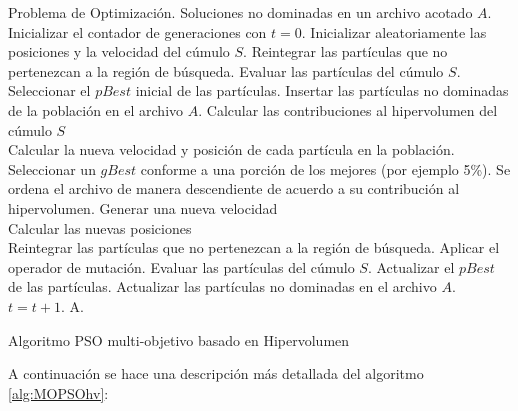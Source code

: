\begin{algorithm}
\begin{algorithmic}[1]
	\REQUIRE Problema de Optimizaci\'on.
	\ENSURE Soluciones no dominadas en un archivo acotado $A$.	  
	  \STATE Inicializar el contador de generaciones con $t=0$.
	  \STATE Inicializar aleatoriamente las posiciones y la velocidad del c\'umulo $S$.
	  \STATE Reintegrar las part\'iculas que no pertenezcan a la regi\'on de b\'usqueda.
	  \STATE Evaluar las part\'iculas del c\'umulo $S$.
	  \STATE Seleccionar el $pBest$ inicial de las part\'iculas.  
	  \STATE Insertar las part\'iculas no dominadas de la poblaci\'on en el archivo $A$.
	  \STATE Calcular las contribuciones al hipervolumen del c\'umulo $S$
	  \\ Calcular la nueva velocidad y posici\'on de cada part\'icula en la poblaci\'on.
	     \STATE Seleccionar un $gBest$ conforme a una porci\'on de los mejores (por ejemplo 5\%). Se ordena el archivo
	     de manera descendiente de acuerdo a su contribuci\'on al hipervolumen.
	     \STATE Generar una nueva velocidad 
		\\  \DIFdelbegin {}\DIFdelend \DIFaddbegin {}\DIFaddend \STATE Calcular las nuevas posiciones 
		\\\DIFdelbegin {}\DIFdelend \DIFaddbegin {}\DIFaddend \ENDFOR
		\STATE Reintegrar las part\'iculas que no pertenezcan a la regi\'on de b\'usqueda.
		\STATE Aplicar el operador de mutaci\'on.
		\STATE Evaluar las part\'iculas del c\'umulo $S$.
		\STATE Actualizar el $pBest$ de las part\'iculas.  
		\STATE Actualizar las part\'iculas no dominadas en el archivo $A$.	
		\STATE $t=t+1$.
	\ENDWHILE
	\RETURN A.
	\end{algorithmic}
	\caption{Algoritmo PSO multi-objetivo basado en Hipervolumen}
	\label{alg:MOPSOhv}
	\end{algorithm}

A continuaci\'on se hace una descripci\'on m\'as detallada del algoritmo \ref{alg:MOPSOhv}:

